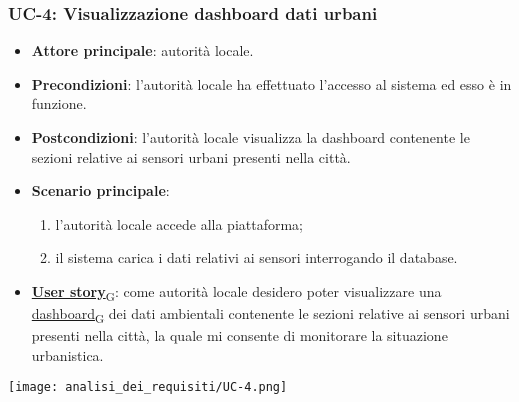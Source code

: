 \subsubsection{UC-4: Visualizzazione dashboard dati urbani}
\begin{itemize}
	\item \textbf{Attore principale}: autorità locale.
	\item \textbf{Precondizioni}: l'autorità locale ha effettuato l'accesso al sistema ed esso è in funzione.
	\item \textbf{Postcondizioni}: l'autorità locale visualizza la dashboard contenente le sezioni relative ai sensori urbani presenti nella città.
	\item \textbf{Scenario principale}:
	      \begin{enumerate}
		      \item l'autorità locale accede alla piattaforma;
		      \item il sistema carica i dati relativi ai sensori interrogando il database.
	      \end{enumerate}
	\item \href{https://7last.github.io/docs/pb/documentazione-interna/glossario\#user-story}{\textbf{User story}\textsubscript{G}}: come autorità locale desidero poter visualizzare una \href{https://7last.github.io/docs/pb/documentazione-interna/glossario\#dashboard}{dashboard\textsubscript{G}} dei dati ambientali contenente le sezioni relative ai sensori urbani presenti nella città, la quale mi consente di monitorare la situazione urbanistica.
\end{itemize}
\begin{center}
	\texttt{[image: analisi\_dei\_requisiti/UC-4.png]}
\end{center}

